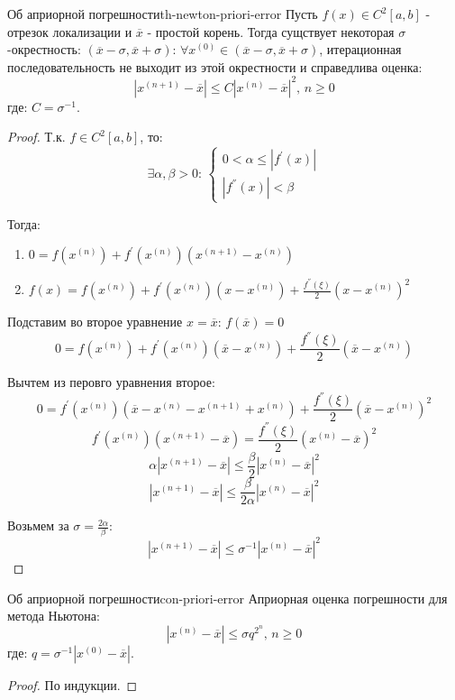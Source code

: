 \documentclass[14pt]{extarticle}
\begin{document}
    \begin{theorem}{Об априорной погрешности}{th-newton-priori-error}
        Пусть $f(x) \in C^{2}[a, b]$ - отрезок локализации и $\overline{x}$ - простой корень. Тогда сущствует некоторая $\sigma$-окрестность: $(\overline{x} - \sigma, \overline{x} + \sigma)$: $\forall x^{(0)} \in (\overline{x} - \sigma, \overline{x} + \sigma)$, итерационная последовательность не выходит из этой окрестности и справедлива оценка:
        $$|x^{(n + 1)} - \overline{x}| \leq C|x^{(n)} - \overline{x}|^{2} \text{, } n \geq 0$$
        где: $C = \sigma^{-1}$.

        \begin{proof}
            Т.к. $f \in C^{2}[a, b]$, то: 
            $$\exists \alpha, \beta > 0 \text{: } \begin{cases} 0 < \alpha \leq |f^{'}(x)| \\ |f^{''}(x)| < \beta \end{cases}$$

            Тогда:
            \begin{enumerate}
                \item $0 = f(x^{(n)}) + f^{'}(x^{(n)})(x^{(n + 1)} - x^{(n)})$
                \item $f(x) = f(x^{(n)}) + f^{'}(x^{(n)})(x - x^{(n)}) + \frac{f^{''}(\xi)}{2}(x - x^{(n)})^{2}$
            \end{enumerate}

            Подставим во второе уравнение $x = \overline{x}$: $f(\overline{x}) = 0$
            $$0 = f(x^{(n)}) + f^{'}(x^{(n)})(\overline{x} - x^{(n)}) + \frac{f^{''}(\xi)}{2}(\overline{x} - x^{(n)})$$

            Вычтем из перовго уравнения второе:
            $$0 = f^{'}(x^{(n)})(\overline{x} - x^{(n)} - x^{(n + 1)} + x^{(n)}) + \frac{f^{''}(\xi)}{2}(\overline{x} - x^{(n)})^{2}$$
            $$f^{'}(x^{(n)})(x^{(n + 1)} - \overline{x}) = \frac{f^{''}(\xi)}{2}(x^{(n)} - \overline{x})^{2}$$
            $$\alpha |x^{(n + 1)} - \overline{x}| \leq \frac{\beta}{2}|x^{(n)} - \overline{x}|^{2}$$
            $$|x^{(n + 1)} - \overline{x}| \leq \frac{\beta}{2\alpha}|x^{(n)} - \overline{x}|^{2}$$

            Возьмем за $\sigma = \frac{2\alpha}{\beta}$:
            $$|x^{(n + 1)} - \overline{x}| \leq \sigma^{-1} |x^{(n)} - \overline{x}|^{2}$$
        \end{proof}
    \end{theorem}

    \begin{consequence}{Об априорной погрешности}{con-priori-error}
        Априорная оценка погрешности для метода Ньютона:
        $$|x^{(n)} - \overline{x}| \leq \sigma q^{2^{n}} \text{, } n \geq 0$$
        где: $q = \sigma^{-1}|x^{(0)} - \overline{x}|$.
    
        \begin{proof}
            По индукции.
        \end{proof}
    \end{consequence}
\end{document}
